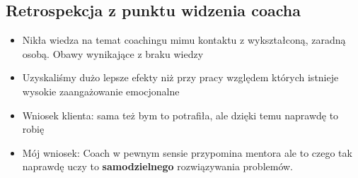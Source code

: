 \subsection{Retrospekcja z punktu widzenia coacha}

\begin{itemize}
  \item Nikła wiedza na temat coachingu mimu kontaktu z wykształconą, zaradną osobą. Obawy wynikające z braku wiedzy
  \item Uzyskaliśmy dużo lepsze efekty niż przy pracy względem których istnieje wysokie zaangażowanie emocjonalne
  \item Wniosek klienta: sama też bym to potrafiła, ale dzięki temu naprawdę to robię
  \item Mój wniosek: Coach w pewnym sensie przypomina mentora ale to czego tak naprawdę uczy to \textbf{samodzielnego} rozwiązywania problemów.
\end{itemize}
